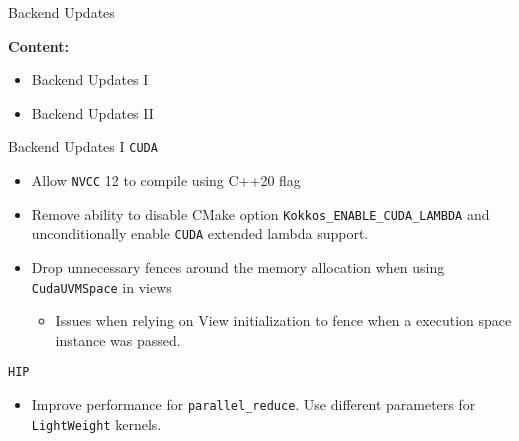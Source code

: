 

\begin{frame}[fragile]

  {\Huge Backend Updates}

  \vspace{10pt}

  \textbf{Content:}
  \begin{itemize}
    \item Backend Updates I
    \item Backend Updates II
  \end{itemize}

\end{frame}


\begin{frame}[fragile]{Backend Updates I}
\texttt{CUDA}
\begin{itemize}
    \item Allow \texttt{NVCC} 12 to compile using C++20 flag 
    \item Remove ability to disable CMake option \texttt{Kokkos\_ENABLE\_CUDA\_LAMBDA} and unconditionally enable \texttt{CUDA} extended lambda support.
    \item Drop unnecessary fences around the memory allocation when using \texttt{CudaUVMSpace} in views
    \begin{itemize}
      \item Issues when relying on View initialization to fence when a execution space instance was passed.
    \end{itemize}
\end{itemize}
\vfill
\texttt{HIP}
\begin{itemize}
    \item Improve performance for \texttt{parallel\_reduce}. Use different parameters for \texttt{LightWeight} kernels.
\end{itemize}
\end{frame}


